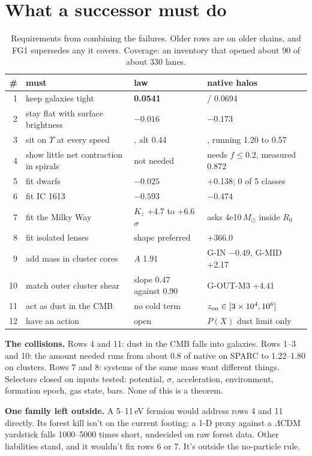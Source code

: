 \documentclass[10pt]{article}
\begin{document}
\section{What a successor must do}\label{sec:req}
\begin{table}[h]\centering\small
\caption{Requirements from combining the failures. Older rows are on older chains, and FG1 supersedes any it covers. Coverage: an inventory that opened about 90 of about 330 lanes.}
\begin{tabular}{r>{\raggedright\arraybackslash}p{5.2cm}>{\raggedright\arraybackslash}p{3.2cm}>{\raggedright\arraybackslash}p{4.8cm}}
\toprule
\# & must & law & native halos\\
\midrule
1 & keep galaxies tight & \textbf{0.0541} & 0.0682 / 0.0694\\
2 & stay flat with surface brightness & \textbf{$-0.016$} & $-0.173$\\
3 & sit on $\Upsilon$ at every speed & 0.52, alt 0.44 & 0.75, running 1.20 to 0.57\\
4 & show little net contraction in spirals & not needed & needs $f\le0.2$, measured 0.872\\
5 & fit dwarfs & \textbf{$-0.025$} & +0.138; 0 of 5 classes\\
6 & fit IC 1613 & $-0.593$ & $-0.474$\\
7 & fit the Milky Way & $K_z$ +4.7 to +6.6$\sigma$ & asks 4e10\,$M_\odot$ inside $R_0$\\
8 & fit isolated lenses & shape preferred & +366.0\\
9 & add mass in cluster cores & $A$ 1.91 & G-IN $-0.49$, G-MID +2.17\\
10 & match outer cluster shear & slope 0.47 against 0.90 & G-OUT-M3 +4.41\\
11 & act as dust in the CMB & no cold term & $z_{\rm on}\in[3\times10^4,10^6]$\\
12 & have an action & open & $P(X)$ dust limit only\\
\bottomrule
\end{tabular}
\end{table}
\textbf{The collisions.} Rows 4 and 11: dust in the CMB falls into galaxies. Rows 1--3 and 10: the amount needed runs from about 0.8 of native on SPARC to 1.22--1.80 on clusters. Rows 7 and 8: systems of the same mass want different things. Selectors closed on inputs tested: potential, $\sigma$, acceleration, environment, formation epoch, gas state, bars. None of this is a theorem.

\textbf{One family left outside.} A 5--11\,eV fermion would address rows 4 and 11 directly. Its forest kill isn't on the current footing: a 1-D proxy against a $\Lambda$CDM yardstick falls 1000--5000 times short, undecided on raw forest data. Other liabilities stand, and it wouldn't fix rows 6 or 7. It's outside the no-particle rule.
\end{document}
